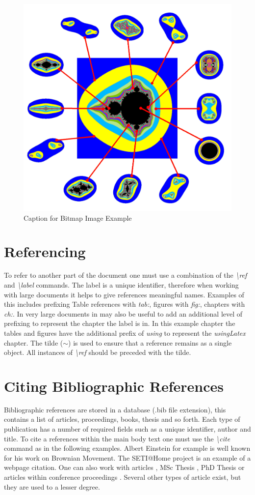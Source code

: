 \begin{figure}[H]
\begin{center}
\includegraphics[width=.34\linewidth,natwidth=610,natheight=642]{usingLatex/images/samplepng}
\caption{Caption for Bitmap Image Example} \label{fig:using:samplepngImage}
\end{center}
\end{figure}

\section{Referencing}

To refer to another part of the document one must use a combination of the \emph{\textbackslash ref} and \emph{\textbackslash label} commands. The label is a unique identifier, therefore when working with large documents it helps to give references meaningful names. Examples of this includes prefixing Table references with \emph{tab:}, figures with \emph{fig:}, chapters with \emph{ch:}. In very large documents in may also be useful to add an additional level of prefixing to represent the chapter the label is in. In this example chapter the tables and figures have the additional prefix of \emph{using} to represent the \emph{usingLatex} chapter. The tilde ($\sim$) is used to ensure that a reference remains as a single object. All instances of \emph{\textbackslash ref} should be preceded with the tilde.

\section{Citing Bibliographic References}

Bibliographic references are stored in a database (.bib file extension), this contains a list of articles, proceedings, books, thesis and so forth. Each type of publication has a number of required fields such as a unique identifier, author and title. To cite a references within the main body text one must use the \emph{\textbackslash cite} command as in the following examples.  Albert Einstein \cite{book:einsteinBrownianMovement} for example is well known for his work on Brownian Movement. The SETI@Home project \cite{web:berkeleyBOINC} is an example of a webpage citation. One can also work with articles \cite{art:Moller2003HWRastArch}, MSc Thesis \cite{msc:Edberg2007FluxgateMagnetometer}, PhD Thesis \cite{phd:Grace2004MiddlewareMobile} or articles within conference proceedings \cite{proc:Park2006UIMgtRmtRobots}. Several other types of article exist, but they are used to a lesser degree.

